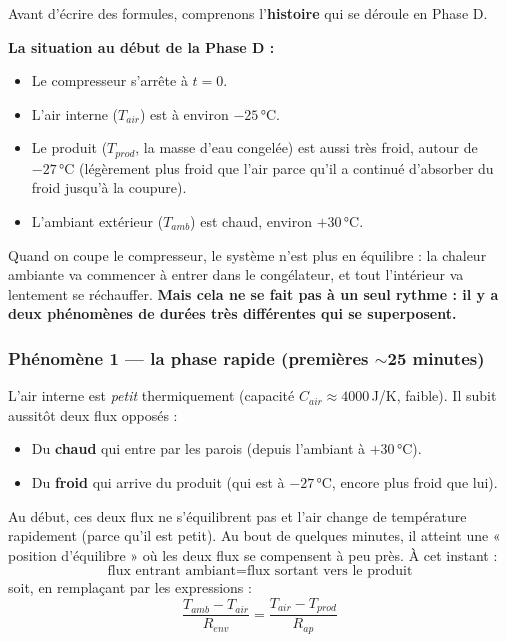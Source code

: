 \documentclass[11pt,a4paper]{article}
\begin{document}
Avant d'écrire des formules, comprenons l'\textbf{histoire} qui se déroule en Phase D.

\begin{principe}
\textbf{La situation au début de la Phase D :}
\begin{itemize}[itemsep=0pt]
\item Le compresseur s'arrête à $t = 0$.
\item L'air interne ($T_{air}$) est à environ $-25\,\si{\celsius}$.
\item Le produit ($T_{prod}$, la masse d'eau congelée) est aussi très froid, autour de
$-27\,\si{\celsius}$ (légèrement plus froid que l'air parce qu'il a continué d'absorber
du froid jusqu'à la coupure).
\item L'ambiant extérieur ($T_{amb}$) est chaud, environ $+30\,\si{\celsius}$.
\end{itemize}

Quand on coupe le compresseur, le système n'est plus en équilibre : la chaleur ambiante va
commencer à entrer dans le congélateur, et tout l'intérieur va lentement se réchauffer.
\textbf{Mais cela ne se fait pas à un seul rythme : il y a deux phénomènes de durées très
différentes qui se superposent.}
\end{principe}

\subsubsection*{Phénomène 1 — la phase rapide (premières $\sim$25 minutes)}

L'air interne est \emph{petit} thermiquement (capacité $C_{air} \approx 4000\,$J/K, faible).
Il subit aussitôt deux flux opposés :
\begin{itemize}[itemsep=0pt]
\item Du \textbf{chaud} qui entre par les parois (depuis l'ambiant à $+30\,\si{\celsius}$).
\item Du \textbf{froid} qui arrive du produit (qui est à $-27\,\si{\celsius}$, encore plus
froid que lui).
\end{itemize}

Au début, ces deux flux ne s'équilibrent pas et l'air change de température rapidement
(parce qu'il est petit). Au bout de quelques minutes, il atteint une « position d'équilibre »
où les deux flux se compensent à peu près. À cet instant :
$$\text{flux entrant ambiant} = \text{flux sortant vers le produit}$$
soit, en remplaçant par les expressions :
$$\frac{T_{amb} - T_{air}}{R_{env}} = \frac{T_{air} - T_{prod}}{R_{ap}}$$
\end{document}
